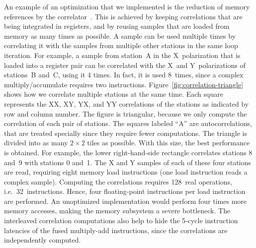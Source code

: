\documentclass{sig-alternate}
\begin{document}
An example of an optimization that we implemented is the reduction of
memory references by the correlator~\cite{Romein:06}.
This is achieved by keeping correlations that are being integrated
in registers, and by reusing samples that are loaded from memory as many times
as possible.
A sample can be used multiple times by correlating it with the samples from
multiple other stations in the same loop iteration.
For example, a sample from station~A in the X~polarization that is loaded into
a register pair can be correlated with the X~and Y~polarizations of
stations~B and~C, using it 4 times.
In fact, it is used 8~times, since a complex multiply/accumulate requires two
instructions.
Figure~\ref{fig:correlation-triangle} shows how we correlate multiple
stations at the same time.
Each square represents the XX, XY, YX, and YY correlations of the stations
as indicated by row and column number.
The figure is triangular, because we only compute the correlation of each
pair of stations.
The squares labeled ``\textsf{A}'' are autocorrelations, that are treated
specially since they require fewer computations.
The triangle is divided into as many $2\times2$ tiles as possible. With this size, 
the best performance is obtained.
For example, the lower right-hand-side rectangle correlates stations 8 and~9
with stations 0 and~1.
The X and Y samples of each of these four stations are read, requiring eight
memory load instructions (one load instruction reads a complex sample).
Computing the correlations requires 128~real operations, i.e.\ 32~instructions.
Hence, four floating-point instructions per load instruction are performed.
An unoptimized implementation would perform four times more memory accesses,
making the memory subsystem a severe bottleneck.
The interleaved correlation computations also help to hide the 5-cycle
instruction latencies of the fused multiply-add instructions, since
the correlations are independently computed.


\end{document}
